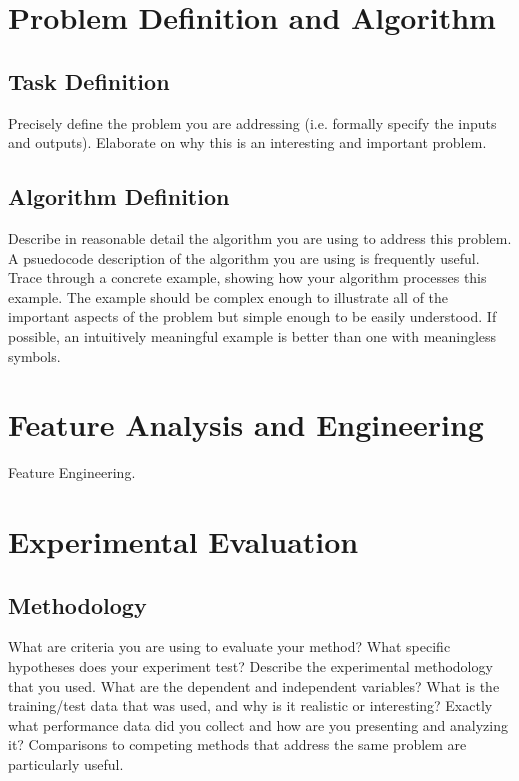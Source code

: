 \documentclass[conference,draft]{IEEEtran}
\begin{document}
\section{Problem Definition and Algorithm}

\subsection{Task Definition}

Precisely define the problem you are addressing (i.e. formally specify the
inputs and outputs). Elaborate on why this is an interesting and important
problem. 

\subsection{Algorithm Definition}

Describe in reasonable detail the algorithm you are using to address this
problem. A psuedocode description of the algorithm you are using is frequently
useful. Trace through a concrete example, showing how your algorithm processes
this example. The example should be complex enough to illustrate all of the
important aspects of the problem but simple enough to be easily understood. If
possible, an intuitively meaningful example is better than one with meaningless
symbols. 

\section{Feature Analysis and Engineering}

Feature Engineering.

\section{Experimental Evaluation}

\subsection{Methodology}

What are criteria you are using to evaluate your method? What specific
hypotheses does your experiment test? Describe the experimental methodology
that you used. What are the dependent and independent variables? What is the
training/test data that was used, and why is it realistic or interesting?
Exactly what performance data did you collect and how are you presenting and
analyzing it? Comparisons to competing methods that address the same problem
are particularly useful. 
\end{document}
